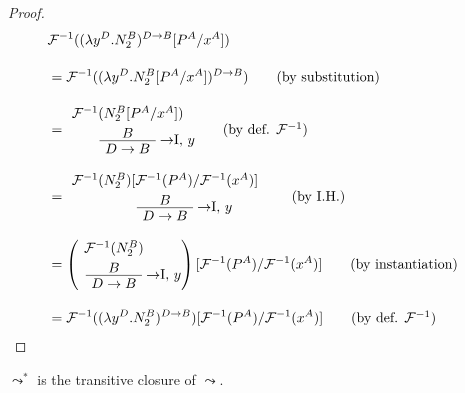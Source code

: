\begin{proof}
\begin{align*}
\lefteqn{\chmapantasub{(\lambda y^D.N_2^B)^{D \to B}}{P^A}{x^A}} \\[10pt]
  &=
  \chmapanta((\lambda y^D.N_2^B[P^A/x^A])^{D \to B})
  \tag{by substitution}\\[10pt]
  &=
  \implintro{%
    \AxiomC{$\chmapantasub{N_2^B}{P^A}{x^A}$}\noLine\UnaryInfC{$B$}
  }{y}{$D \to B$}
  \DisplayProof \tag{by def. $\chmapanta$}\\[10pt]
  &=
  \implintro{%
    \AxiomC{$\subchmapanta{N_2^B}{P^A}{x^A}$}\noLine\UnaryInfC{$B$}
  }{y}{$D \to B$}
  \DisplayProof \tag{by I.H.}\\[10pt]
  &=
  \left(
  \implintro{%
    \AxiomC{$\chmapanta(N_2^B)$}\noLine\UnaryInfC{$B$}
  }{y}{$D \to B$}
  \DisplayProof
  \right)[\chmapanta(P^A)/\chmapanta(x^A)] \tag{by instantiation} \\[10pt]
  &= \subchmapanta{(\lambda y^D.N_2^B)^{D \to B}}{P^A}{x^A} \tag{by def. $\chmapanta$}
\end{align*}

\end{proof}

\begin{definition}[$\leadsto^*$]
$\leadsto^*$ is the transitive closure of $\leadsto$.
\end{definition}
